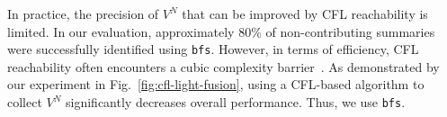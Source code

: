 In practice, the precision of $V^{N}$ that can be improved by CFL reachability is limited. In our evaluation, approximately 80\% of non-contributing summaries were successfully identified using \texttt{bfs}.
However, in terms of efficiency, CFL reachability often encounters a cubic complexity barrier~\cite{kodumal2004set, chaudhuri2008subcubic, yannakakis1990graph, melski2000interconvertibility}. 
As demonstrated by our experiment in Fig.~\ref{fig:cfl-light-fusion}, using a CFL-based algorithm to collect $V^{N}$ significantly decreases overall performance. 
Thus, we use \texttt{bfs}.


